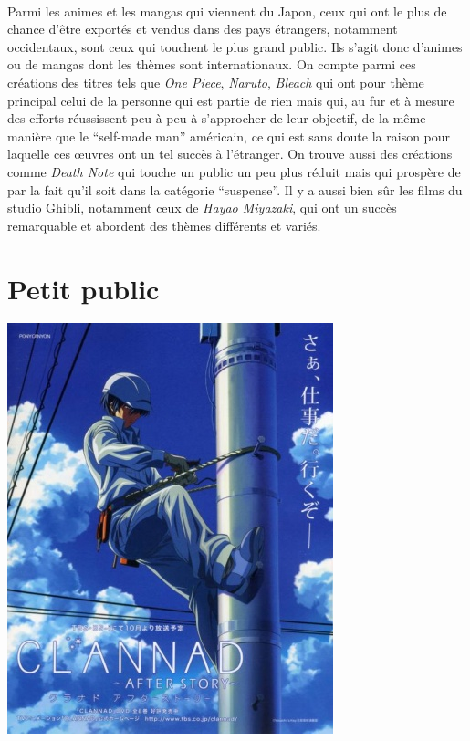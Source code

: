 \paragraph{} Parmi les animes et les mangas qui viennent du Japon, ceux qui ont
le plus de chance d'être exportés et vendus dans des pays étrangers, notamment
occidentaux, sont ceux qui touchent le plus grand public. Ils s'agit donc
d'animes ou de mangas dont les thèmes sont internationaux. On compte parmi ces
créations des titres tels que \textit{One Piece}, \textit{Naruto},
\textit{Bleach} qui ont pour thème principal celui de la personne qui est
partie de rien mais qui, au fur et à mesure des efforts réussissent peu à peu à
s'approcher de leur objectif, de la même manière que le ``self-made man''
américain, ce qui est sans doute la raison pour laquelle ces œuvres ont un tel
succès à l'étranger. On trouve aussi des créations comme \textit{Death Note}
qui touche un public un peu plus réduit mais qui prospère de par la fait qu'il
soit dans la catégorie ``suspense''. Il y a aussi bien sûr les films du
studio Ghibli, notamment ceux de \textit{Hayao Miyazaki}, qui ont un succès
remarquable et abordent des thèmes différents et variés.

\section{Petit public}

\begin{center}
	\includegraphics[scale=0.4]{Clannad.jpg}
\end{center}

